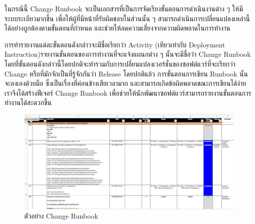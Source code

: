 ในกรณีนี้ Change Runbook จะเป็นเอกสารที่เป็นการจัดเรียงขั้นตอนการดำเนินงานต่าง ๆ ให้มีระบบระเบียวมากขึ้น เพื่อให้ผู้ที่มีหน้าที่รับผิดชอบในส่วนนั้น ๆ สามารถดำเนินการเปลี่ยนแปลงเหล่านี้ได้อย่างถูกต้องตามขั้นตอนที่กำหนด และช่วยให้ลดความเสี่ยงจากความผิดพลาดในการทำงาน

การทำรายงานแต่ละขั้นตอนดังกล่าวจะมีชื่อเรียกว่า Activity (เทียวเท่ากับ Deployment Instruction)รายงานขั้นตอนของการทำงานที่จะแจ้งแผนกต่าง ๆ นั้นจะมีชื่อว่า Change Runbook โดยที่ขั้นตอนดังกล่าวนี้โดยปกติจะทำรวมกับการเปลี่ยนแปลงเวอร์ชั่นของซอฟต์แวร์ที่จะเรียกว่า Change หรือที่มักจักเป็นที่รู้จักกันว่า Release โดยปกติแล้ว การขั้นตอนการเขียน Runbook นั้นจะลงเองด้วยมือ ซึ่งเป็นเรื่องที่ค่อนข้างเสียเวลามาก และสามารถเกิดข้อผิดพลาดขณะการเขียนได้ง่าย เราจึงได้สร้างฟีเจอร์ Change Runbook เพื่อช่วยให้นักพัฒนาซอฟต์แวร์สามารถรายงานขั้นตอนการทำงานได้สะดวกขึ้น

\begin{figure}[H]
    \begin{center}
        \includegraphics[scale=0.325]{resources/change-runbook-example-blurred.png}
    \end{center}
    \caption[ตัวอย่าง Change Runbook]{ตัวอย่าง Change Runbook}
    \label{fig:keycloak-er}
\end{figure}

